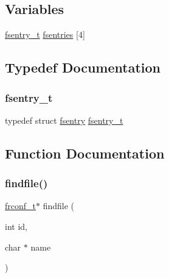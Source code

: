 \subsection*{Variables}
\begin{DoxyCompactItemize}
\item 
\hyperlink{a00146_a9ccf6560e8aebea3e4402a31e8c0f46b_a9ccf6560e8aebea3e4402a31e8c0f46b}{fsentry\+\_\+t} \hyperlink{a00146_a6b46131164b26e476762930c9aae4319_a6b46131164b26e476762930c9aae4319}{fsentries} \mbox{[}4\mbox{]}
\end{DoxyCompactItemize}


\subsection{Typedef Documentation}
\mbox{\label{a00146_a9ccf6560e8aebea3e4402a31e8c0f46b_a9ccf6560e8aebea3e4402a31e8c0f46b}} 
\subsubsection{\texorpdfstring{fsentry\+\_\+t}{fsentry\_t}}
{\footnotesize\ttfamily typedef struct \hyperlink{a00262}{fsentry}  \hyperlink{a00146_a9ccf6560e8aebea3e4402a31e8c0f46b_a9ccf6560e8aebea3e4402a31e8c0f46b}{fsentry\+\_\+t}}



\subsection{Function Documentation}
\mbox{\label{a00146_a5c15724e6f3ef2c0df67ccedfc8639eb_a5c15724e6f3ef2c0df67ccedfc8639eb}} 
\subsubsection{\texorpdfstring{findfile()}{findfile()}}
{\footnotesize\ttfamily \hyperlink{a00185_a752f1bef3c13b98d682fddc44a9e47c8_a752f1bef3c13b98d682fddc44a9e47c8}{frconf\+\_\+t}$\ast$ findfile (\begin{DoxyParamCaption}\item[{int}]{id,  }\item[{char $\ast$}]{name }\end{DoxyParamCaption})}



